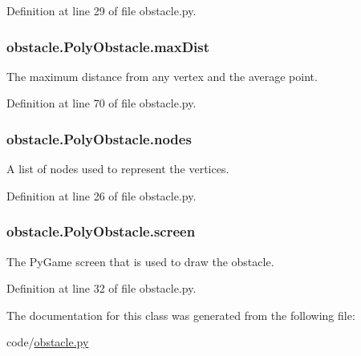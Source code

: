 Definition at line 29 of file obstacle.\-py.

\hypertarget{classobstacle_1_1PolyObstacle_a14e97b3f09f9ff21f36efc7a58759e5c}{
\subsubsection[{max\-Dist}]{\setlength{\rightskip}{0pt plus 5cm}obstacle.\-Poly\-Obstacle.\-max\-Dist}}\label{classobstacle_1_1PolyObstacle_a14e97b3f09f9ff21f36efc7a58759e5c}


The maximum distance from any vertex and the average point. 



Definition at line 70 of file obstacle.\-py.

\hypertarget{classobstacle_1_1PolyObstacle_a125762f0b4a3c9ef8d75c81bc5bc608e}{
\subsubsection[{nodes}]{\setlength{\rightskip}{0pt plus 5cm}obstacle.\-Poly\-Obstacle.\-nodes}}\label{classobstacle_1_1PolyObstacle_a125762f0b4a3c9ef8d75c81bc5bc608e}


A list of nodes used to represent the vertices. 



Definition at line 26 of file obstacle.\-py.

\hypertarget{classobstacle_1_1PolyObstacle_ad65d210c167b0638ef317ef24670501c}{
\subsubsection[{screen}]{\setlength{\rightskip}{0pt plus 5cm}obstacle.\-Poly\-Obstacle.\-screen}}\label{classobstacle_1_1PolyObstacle_ad65d210c167b0638ef317ef24670501c}


The Py\-Game screen that is used to draw the obstacle. 



Definition at line 32 of file obstacle.\-py.



The documentation for this class was generated from the following file\-:\begin{DoxyCompactItemize}
\item 
code/\hyperlink{obstacle_8py}{obstacle.\-py}\end{DoxyCompactItemize}

